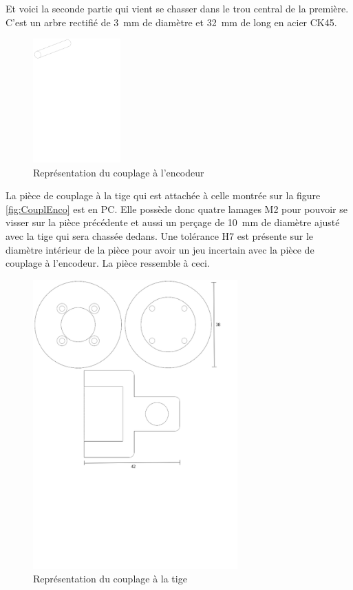 Et voici la seconde partie qui vient se chasser dans le trou central de la première. C'est un arbre rectifié de 3~mm de diamètre et 32~mm
de long en acier CK45.
\begin{figure}[H]
  \centering
  \includegraphics[width = 0.3\textwidth]{assets/figures/CouplageEncodeur2.svg}
  \caption{Représentation du couplage à l'encodeur}
  \label{fig:CouplEnco2}
\end{figure}

La pièce de couplage à la tige qui est attachée à celle montrée sur la figure \ref{fig:CouplEnco} est en \acrshort{PC}. Elle possède donc quatre
lamages M2 pour pouvoir se visser sur la pièce précédente et aussi un perçage de 10~mm de diamètre ajusté avec la tige qui sera chassée dedans.
Une tolérance H7 est présente sur le diamètre intérieur de la pièce pour avoir un jeu incertain avec la pièce de couplage à l'encodeur.
La pièce ressemble à ceci.

\begin{figure}[H]
  \centering
  \includegraphics[width = 0.7\textwidth]{assets/figures/CouplageTige.svg}
  \caption{Représentation du couplage à la tige}
  \label{fig:CouplTige}
\end{figure}

